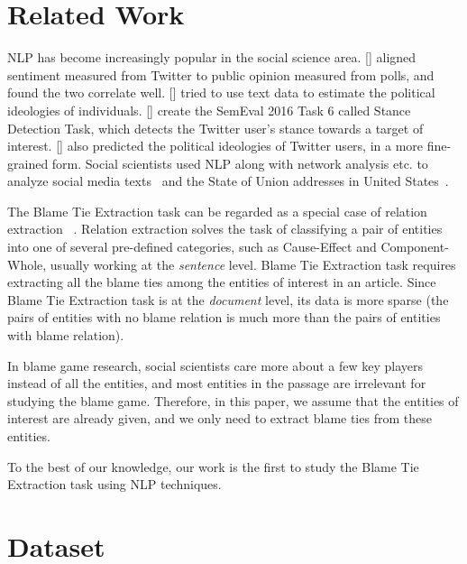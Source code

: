 \documentclass[letterpaper]{article} %
\begin{document}
\section{Related Work}
\label{task}

NLP has become increasingly popular in the social science area. \citeauthor{o2010tweets} [\citeyear{o2010tweets}] aligned sentiment measured from Twitter to public opinion measured from polls, and found the two correlate well. \citeauthor{bamman2015open} [\citeyear{bamman2015open}] tried to use text data to estimate the political ideologies of individuals. \citeauthor{mohammad-EtAl:2016:SemEval} [\citeyear{mohammad-EtAl:2016:SemEval}] create the SemEval 2016 Task 6 called Stance Detection Task, which detects the Twitter user's stance towards a target of interest. \citeauthor{preoctiuc2017beyond} [\citeyear{preoctiuc2017beyond}] also predicted the political ideologies of Twitter users, in a more fine-grained form. Social scientists used NLP along with network analysis etc. to analyze social media texts~\cite{rule2015lexical} and the State of Union addresses in United States~\cite{bail2016combining}.

The Blame Tie Extraction task can be regarded as a special case of relation extraction ~\cite{miwa2016end}. Relation extraction solves the task of classifying a pair of entities into one of several pre-defined categories, such as Cause-Effect and Component-Whole, usually working at the {\it sentence} level. Blame Tie Extraction task requires extracting all the blame ties among the entities of interest in an article. Since Blame Tie Extraction task is at the {\it document} level, its data is more sparse (the pairs of entities with no blame relation is much more than the pairs of entities with blame relation).

In blame game research, social scientists care more about a few key players instead of all the entities, and most entities in the passage are irrelevant for studying the blame game. Therefore, in this paper, we assume that the entities of interest are already given, and we only need to extract blame ties from these entities.

To the best of our knowledge, our work is the first to study the Blame Tie Extraction task using NLP techniques.

\section{Dataset}
\label{dataset}
\end{document}
